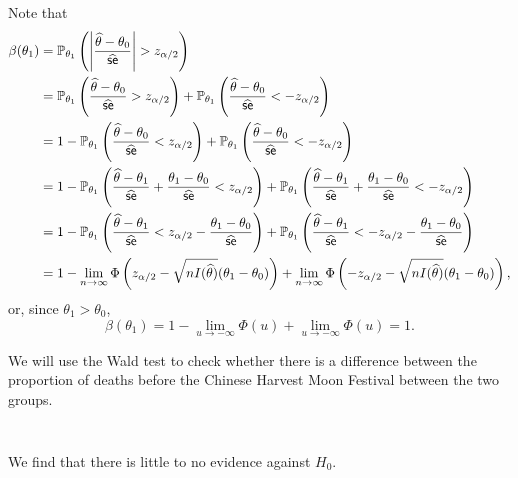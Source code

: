 \begin{ex}
  Note that
  \begin{align*}
    \beta(\theta_1)
     & =\mathbb{P}_{\theta_1}\left(\left|\frac{\widehat{\theta}-\theta_0}{\widehat{\textsf{se}}}\right| > z_{\alpha/2} \right) \\
     & =\mathbb{P}_{\theta_1}\left(\frac{\widehat{\theta}-\theta_0}{\widehat{\textsf{se}}} > z_{\alpha/2} \right)
    +\mathbb{P}_{\theta_1}\left(\frac{\widehat{\theta}-\theta_0}{\widehat{\textsf{se}}} < -z_{\alpha/2} \right)                \\
     & =1
    -\mathbb{P}_{\theta_1}\left(\frac{\widehat{\theta}-\theta_0}{\widehat{\textsf{se}}} < z_{\alpha/2} \right)
    +\mathbb{P}_{\theta_1}\left(\frac{\widehat{\theta}-\theta_0}{\widehat{\textsf{se}}} < -z_{\alpha/2} \right)                \\
     & =1
    -\mathbb{P}_{\theta_1}
    \left(\frac{\widehat{\theta}-\theta_1}{\widehat{\textsf{se}}}
    +\frac{\theta_1-\theta_0}{\widehat{\textsf{se}}}
    < z_{\alpha/2} \right)
    +\mathbb{P}_{\theta_1}\left(
    \frac{\widehat{\theta}-\theta_1}{\widehat{\textsf{se}}}
    +\frac{\theta_1-\theta_0}{\widehat{\textsf{se}}}
    < -z_{\alpha/2} \right)                                                                              \\
     & =1
    -\mathbb{P}_{\theta_1}
    \left(\frac{\widehat{\theta}-\theta_1}{\widehat{\textsf{se}}}
    < z_{\alpha/2}
    -\frac{\theta_1-\theta_0}{\widehat{\textsf{se}}}
    \right)
    +\mathbb{P}_{\theta_1}\left(
    \frac{\widehat{\theta}-\theta_1}{\widehat{\textsf{se}}}
    < -z_{\alpha/2}
    -\frac{\theta_1-\theta_0}{\widehat{\textsf{se}}}
    \right)                                                                                              \\
     & =1-\lim_{n\to\infty}\Phi\left(z_{\alpha/2}-\sqrt{nI(\widehat{\theta})}(\theta_1-\theta_0)\right)
    +\lim_{n\to\infty}\Phi\left(-z_{\alpha/2}-\sqrt{nI(\widehat{\theta})}(\theta_1-\theta_0)\right),
  \end{align*}
  or, since $\theta_1>\theta_0$,
  \[
    \beta(\theta_1)
    = 1 - \lim_{u\to-\infty}\Phi(u)+\lim_{u\to-\infty}\Phi(u)
    = 1.
  \]
\end{ex}

\begin{ex}
  We will use the Wald test to check whether there is a difference between the
  proportion of deaths before the Chinese Harvest Moon Festival between the two
  groups.
  \inputminted{python}{../code/10-10.py}
  \inputminted{text}{../output/10-10.txt}

  We find that there is little to no evidence against $H_0$.
\end{ex}

